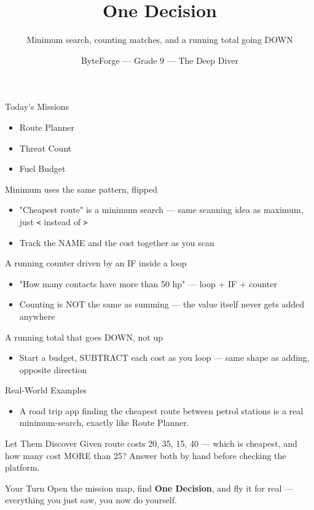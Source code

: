 \documentclass[aspectratio=169]{beamer}
\title{One Decision}
\subtitle{Minimum search, counting matches, and a running total going DOWN}
\author{ByteForge --- Grade 9 --- The Deep Diver}
\date{}
\begin{document}
\begin{frame}
    \titlepage
\end{frame}

\begin{frame}{Today's Missions}
    \Large
    \begin{itemize}
        \item Route Planner
        \item Threat Count
        \item Fuel Budget
    \end{itemize}
\end{frame}

\begin{frame}{Minimum uses the same pattern, flipped}
    \large
    \begin{itemize}
        \item "Cheapest route" is a minimum search --- same scanning idea as maximum, just \texttt{<} instead of \texttt{>}
        \item Track the NAME and the cost together as you scan
    \end{itemize}
\end{frame}


\begin{frame}{A running counter driven by an IF inside a loop}
    \large
    \begin{itemize}
        \item "How many contacts have more than 50 hp" --- loop + IF + counter
        \item Counting is NOT the same as summing --- the value itself never gets added anywhere
    \end{itemize}
\end{frame}


\begin{frame}{A running total that goes DOWN, not up}
    \large
    \begin{itemize}
        \item Start a budget, SUBTRACT each cost as you loop --- same shape as adding, opposite direction
    \end{itemize}
\end{frame}

\begin{frame}{Real-World Examples}
    \large
    \begin{itemize}
        \item A road trip app finding the cheapest route between petrol stations is a real minimum-search, exactly like Route Planner.
    \end{itemize}
\end{frame}


\begin{frame}{Let Them Discover}
    \large
    Given route costs 20, 35, 15, 40 --- which is cheapest, and how many cost MORE than 25? Answer both by hand before checking the platform.
\end{frame}

\begin{frame}{Your Turn}
    \Large
    Open the mission map, find \textbf{One Decision}, and fly it for real ---
    everything you just saw, you now do yourself.
\end{frame}
\end{document}
